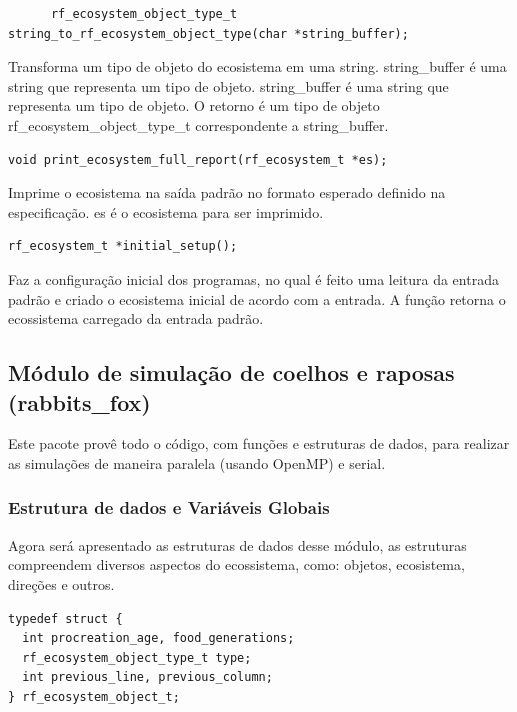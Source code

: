 \documentclass{article}
\begin{document}
\begin{verbatim}
      rf_ecosystem_object_type_t string_to_rf_ecosystem_object_type(char *string_buffer);
      \end{verbatim}

Transforma um tipo de objeto do ecosistema em uma string. string\_buffer é uma string que representa um tipo de objeto. string\_buffer é uma string que representa um tipo de objeto. O retorno é um tipo de objeto rf\_ecosystem\_object\_type\_t correspondente a string\_buffer.


\begin{verbatim}
void print_ecosystem_full_report(rf_ecosystem_t *es);
      \end{verbatim}

Imprime o ecosistema na saída padrão no formato esperado definido na especificação. es é o ecosistema para ser imprimido.

\begin{verbatim}
rf_ecosystem_t *initial_setup();
      \end{verbatim}

Faz a configuração inicial dos programas, no qual é feito uma leitura da entrada padrão e criado o ecosistema inicial de acordo com a entrada. A função retorna o ecossistema carregado da entrada padrão.

\subsection{Módulo de simulação de coelhos e raposas (rabbits\_fox)}

Este pacote provê todo o código, com funções e estruturas de dados, para realizar as simulações de maneira paralela (usando OpenMP) e serial.

\subsubsection{Estrutura de dados e Variáveis Globais}

Agora será apresentado as estruturas de dados desse módulo, as estruturas compreendem diversos aspectos do ecossistema, como: objetos, ecosistema, direções e outros.


\begin{verbatim}
typedef struct {
  int procreation_age, food_generations;
  rf_ecosystem_object_type_t type;
  int previous_line, previous_column;
} rf_ecosystem_object_t;
      \end{verbatim}
\end{document}
